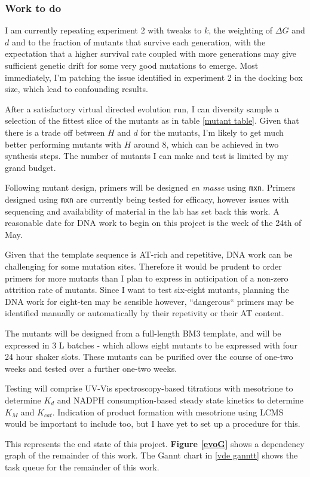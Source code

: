 \documentclass{article}
\begin{document}
\subsubsection{Work to do}\label{vde-todo}
I am currently repeating experiment 2 with tweaks to $k$, the weighting of $\Delta G$ and $d$ and to the fraction of mutants that survive each generation, with the expectation that a higher survival rate coupled with more generations may give sufficient genetic drift for some very good mutations to emerge. Most immediately, I'm patching the issue identified in experiment 2 in the docking box size, which lead to confounding results.
\par
After a satisfactory virtual directed evolution run, I can diversity sample a selection of the fittest slice of the mutants as in table \ref{mutant table}. Given that there is a trade off between $H$ and $d$ for the mutants, I'm likely to get much better performing mutants with $H$ around 8, which can be achieved in two synthesis steps. The number of mutants I can make and test is limited by my grand budget.
\par
Following mutant design, primers will be designed \textit{en masse} using \texttt{mxn}. Primers designed using \texttt{mxn} are currently being tested for efficacy, however issues with sequencing and availability of material in the lab has set back this work. A reasonable date for DNA work to begin on this project is the week of the 24th of May. %
\par
Given that the template sequence is AT-rich and repetitive, DNA work can be challenging for some mutation sites. Therefore it would be prudent to order primers for more mutants than I plan to express in anticipation of a non-zero attrition rate of mutants. Since I want to test six-eight mutants, planning the DNA work for eight-ten may be sensible however, ``dangerous`` primers may be identified manually or automatically by their repetivity or their AT content. %
\par
The mutants will be designed from a full-length BM3 template, and will be expressed in 3 L batches - which allows eight mutants to be expressed with four 24 hour shaker slots. %
These mutants can be purified over the course of one-two weeks and tested over a further one-two weeks. %
\par
Testing will comprise UV-Vis spectroscopy-based titrations with mesotrione to determine $K_d$ and NADPH consumption-based steady state kinetics to determine $K_M$ and $K_{cat}$. Indication of product formation with mesotrione using LCMS would be important to include too, but I have yet to set up a procedure for this.
\par
This represents the end state of this project. \textbf{Figure \ref{evoG}} shows a dependency graph of the remainder of this work. The Gannt chart in \ref{vde ganntt} shows the task queue for the remainder of this work.
\end{document}
